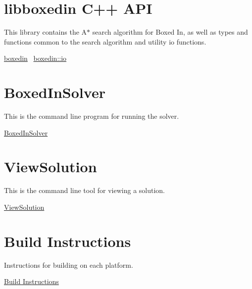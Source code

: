 \hypertarget{index_libboxedin_sec}{}\section{libboxedin C++ A\+P\+I}\label{index_libboxedin_sec}
This library contains the A$\ast$ search algorithm for Boxed In, as well as types and functions common to the search algorithm and utility io functions.

\hyperlink{namespaceboxedin}{boxedin}~\newline
\hyperlink{namespaceboxedin_1_1io}{boxedin\+::io}~\newline
 \hypertarget{index_boxedinsolver_sec}{}\section{Boxed\+In\+Solver}\label{index_boxedinsolver_sec}
This is the command line program for running the solver.

\hyperlink{boxedinsolver_page}{Boxed\+In\+Solver}\hypertarget{index_viewsolution_sec}{}\section{View\+Solution}\label{index_viewsolution_sec}
This is the command line tool for viewing a solution.

\hyperlink{viewsolution_page}{View\+Solution}\hypertarget{index_build_instructions_sec}{}\section{Build Instructions}\label{index_build_instructions_sec}
Instructions for building on each platform.

\hyperlink{build_instructions_page}{Build Instructions} 